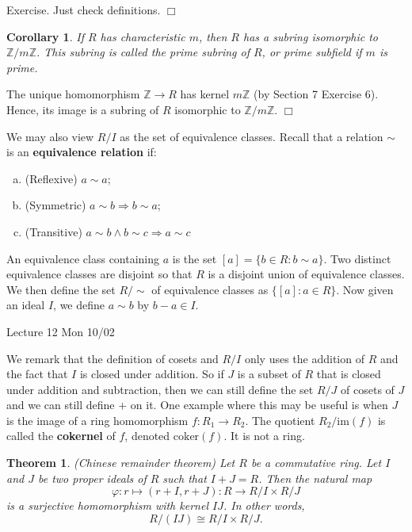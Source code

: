 \documentclass{article}
\def\Z{{\mathbb Z}}
\def\Z{{\mathbb Z}}
\newtheorem{theorem}[subsection]{Theorem}
\newtheorem{cor}[subsection]{Corollary}
\newenvironment{proof}{\noindent {\bf Proof:}}{$\Box$ \vspace{2 ex}}
\newcommand{\add}[1]{{\color{blue} #1}}
\begin{document}
\begin{proof}
    Exercise. Just check definitions.
\end{proof}

\begin{cor}
    If $R$ has characteristic $m$, then $R$ has a subring isomorphic to $\Z/m\Z$. This subring is called the prime subring of $R$, or prime subfield if $m$ is prime. 
\end{cor}

\begin{proof}
    The unique homomorphism $\Z\rightarrow R$ has kernel $m\Z$ (by Section 7 Exercise 6). Hence, its image is a subring of $R$ isomorphic to $\Z/m\Z$.
\end{proof}


\vspace{5pt}
We may also view $R/I$ as the set of equivalence classes. Recall that a relation $\sim$ is an \textbf{equivalence relation} if:
\begin{enumerate}[(a)]
    \item (Reflexive) $a\sim a$;
    \item (Symmetric) $a\sim b\Rightarrow b\sim a$;
    \item (Transitive) $a\sim b \wedge b\sim c\Rightarrow a\sim c$
\end{enumerate}
An equivalence class containing $a$ is the set $[a] = \{b\in R\colon b\sim a\}.$ Two distinct equivalence classes are disjoint so that $R$ is a disjoint union of equivalence classes. We then define the set $R/\!\!\sim$ of equivalence classes as $\{[a]\colon a\in R\}.$ Now given an ideal $I$, we define $a\sim b$ by $b - a \in I$.

\begin{center}
    \add{Lecture 12 Mon 10/02}
\end{center}

We remark that the definition of cosets and $R/I$ only uses the addition of $R$ and the fact that $I$ is closed under addition. So if $J$ is a subset of $R$ that is closed under addition and subtraction, then we can still define the set $R/J$ of cosets of $J$ and we can still define $+$ on it. One example where this may be useful is when $J$ is the image of a ring homomorphism $f:R_1\rightarrow R_2$. The quotient $R_2/\text{im}(f)$ is called the \textbf{cokernel} of $f$, denoted $\text{coker}(f)$. It is not a ring.

\begin{theorem}
    (Chinese remainder theorem) Let $R$ be a commutative ring. Let $I$ and $J$ be two proper ideals of $R$ such that $I + J = R$. Then the natural map $$\varphi:r\mapsto (r+I, r+J) \colon R\rightarrow R/I \times R/J$$
    is a surjective homomorphism with kernel $IJ$. In other words,
    $$R/(IJ)\cong R/I\times R/J.$$
\end{theorem}
\end{document}

